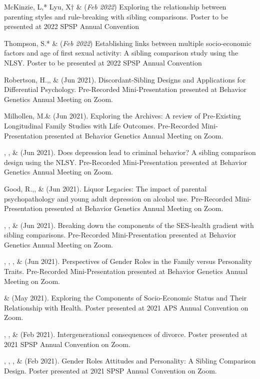 \begin{etaremune}
\item McKinzie, L,* Lyu, X$\dagger$ \& \meb (\textit{Feb 2022}) Exploring the relationship between parenting styles and rule-breaking with sibling comparisons. Poster to be presented at 2022 SPSP Annual Convention
%
\item Thompson, S.* \& \meb (\textit{Feb 2022}) Establishing links between multiple socio-economic factors and age of first sexual activity: A sibling comparison study using the NLSY. Poster to be presented at 2022 SPSP Annual Convention
%
\item Robertson, H.,\noteA \Joe, \&  \meb (Jun 2021). Discordant-Sibling Designs and Applications for Differential Psychology. Pre-Recorded Mini-Presentation presented at Behavior Genetics Annual Meeting on Zoom.
%
\item Milhollen, M.\noteA \&  \meb (Jun 2021). Exploring the Archives: A review of Pre-Existing Longitudinal Family Studies with Life Outcomes. Pre-Recorded Mini-Presentation presented at Behavior Genetics Annual Meeting on Zoom.
%
\item \emsims, \jt, \&  \meb (Jun 2021). Does depression lead to criminal behavior? A sibling comparison design using the NLSY. Pre-Recorded Mini-Presentation presented at Behavior Genetics Annual Meeting on Zoom.
%
\item Good, R.,\noteA \yrh, \&  \meb (Jun 2021). Liquor Legacies: The impact of parental psychopathology and young adult depression on alcohol use. Pre-Recorded Mini-Presentation presented at Behavior Genetics Annual Meeting on Zoom.
%
\item \yrh, \jt, \& \meb (Jun 2021). Breaking down the components of the SES-health gradient with sibling comparisons. Pre-Recorded Mini-Presentation presented at Behavior Genetics Annual Meeting on Zoom.
%
\item \sherrym, \yrh, \jt, \& \meb (Jun 2021). Perspectives of Gender Roles in the Family versus Personality Traits.  Pre-Recorded Mini-Presentation presented at Behavior Genetics Annual Meeting on Zoom.
%
\item \yrh \& \meb (May 2021). Exploring the Components of Socio-Economic Status and Their Relationship with Health. Poster presented at 2021 APS Annual Convention on Zoom.
%
\item \kl, \jt, \& \meb (Feb 2021). Intergenerational consequences of divorce. Poster presented at 2021 SPSP Annual Convention on Zoom.
%
\item \sherrym, \yrh, \jt, \& \meb (Feb 2021). Gender Roles Attitudes and Personality: A Sibling Comparison Design. Poster presented at 2021 SPSP Annual Convention on Zoom.

\end{etaremune}
